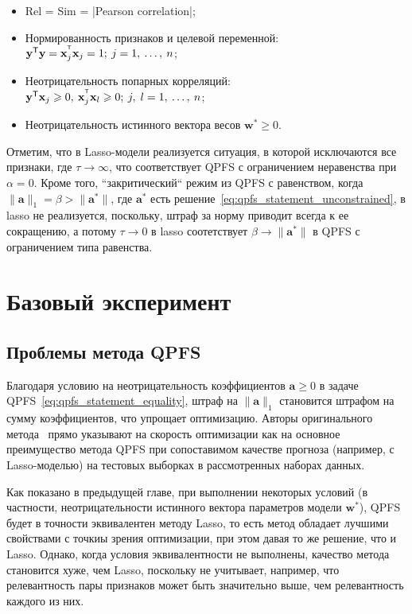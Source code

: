 \documentclass[12pt, twoside]{article}
\newcommand{\ba}{\mathbf{a}}
\newcommand{\bx}{\mathbf{x}}
\newcommand{\by}{\mathbf{y}}
\newcommand{\bw}{\mathbf{w}}
\newcommand{\getT}{^{\mathsf{T}}}
\begin{document}
\begin{itemize}
\item Rel = Sim = |Pearson correlation|;

\item Нормированность признаков и целевой переменной: $\by\getT \by = \bx_j^{\T} \bx_j = 1;\:j=1,\:\ldots,\:n$;

\item Неотрицательность попарных корреляций: $\by\getT \bx_j \geq 0,\:\bx_j^{\T} \bx_l \geq 0;\:j,\;l=1,\:\ldots,\:n$;

\item Неотрицательность истинного вектора весов $\bw^* \geq 0$.
\end{itemize}
Отметим, что в Lasso-модели реализуется ситуация, в которой исключаются все признаки, где $\tau \to \infty$, что соответствует QPFS с ограничением неравенства при $\alpha=0$. Кроме того, ``закритический`` режим из QPFS с равенством, когда $\|\ba\|_1 = \beta > \|\ba^*\|$, где $\ba^*$ есть решение~\eqref{eq:qpfs_statement_unconstrained}, в lasso не реализуется, поскольку, штраф за норму приводит всегда к ее сокращению, а потому $\tau \to 0$ в lasso соотетствует $\beta \to \|\ba^*\|$ в QPFS с ограничением типа равенства.

\section{Базовый эксперимент}

\subsection{Проблемы метода QPFS}
Благодаря условию на неотрицательность коэффициентов $\ba \geq 0$ в задаче QPFS~\eqref{eq:qpfs_statement_equality}, штраф на $\|\ba\|_1$ становится штрафом на сумму коэффициентов, что упрощает оптимизацию. Авторы оригинального метода~\cite{qpfs_original} прямо указывают на скорость оптимизации как на основное преимущество метода QPFS при сопоставимом качестве прогноза (например, с Lasso-моделью) на тестовых выборках в рассмотренных наборах данных. 

Как показано в предыдущей главе, при выполнении некоторых условий (в частности, неотрицательности истинного вектора параметров модели $\bw^*$), QPFS будет в точности эквивалентен методу Lasso, то есть метод обладает лучшими свойствами с точкиы зрения оптимизации, при этом давая то же решение, что и Lasso. Однако, когда условия эквивалентности не выполнены, качество метода становится хуже, чем Lasso, поскольку не учитывает, например, что релевантность пары признаков может быть значительно выше, чем релевантность каждого из них.
\end{document}
